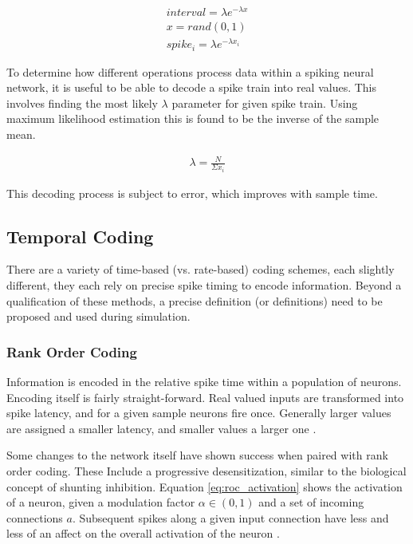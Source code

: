     \begin{align}
        interval = \lambda e^{-\lambda x} \\ x = rand(0,1) \\ spike_i = \lambda
        e^{-\lambda x_i}
    \end{align}
    
    
    
    To determine how different operations process data within a spiking neural
    network, it is useful to be able to decode a spike train into real
    values. This involves finding the most likely $\lambda$ parameter for given
    spike train. Using maximum likelihood estimation this is found to be the
    inverse of the sample mean.
    
    \begin{align}
        \lambda = \frac{N}{\Sigma x_i}
    \end{align}
    
    This decoding process is subject to error, which improves with sample time.
    
    \subsection{Temporal Coding}
    There are a variety of time-based (vs. rate-based) coding schemes, each
    slightly different, they each rely on precise spike timing to encode
    information. Beyond a qualification of these methods, a precise definition
    (or definitions) need to be proposed and used during simulation.
    
    \subsubsection{Rank Order Coding}
    Information is encoded in the relative spike time within a population of
    neurons. Encoding itself is fairly straight-forward. Real
    valued inputs are transformed into spike latency, and for a given sample
    neurons fire once. Generally larger values are assigned a smaller latency,
    and smaller values a larger one \cite{delorme_2001}.
    
    Some changes to the network itself have shown success when paired with rank
    order coding. These Include a progressive desensitization, similar to the
    biological concept of shunting inhibition. Equation \ref{eq:roc_activation}
    shows the activation of a neuron, given a modulation factor $\alpha \in
    (0,1)$ and a set of incoming connections $a$. Subsequent spikes along a
    given input connection have less and less of an affect on the overall
    activation of the neuron \cite{delorme_2001}.
    
